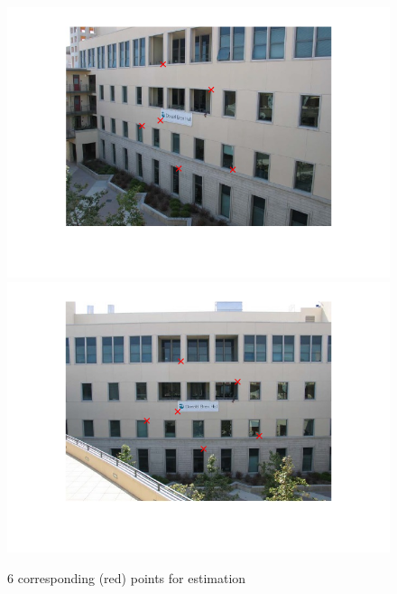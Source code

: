 \documentclass{article}
\theoremstyle{plain} \newtheorem{prop}{Proposition}
\begin{document}
\begin{figure}
	\centering
	\includegraphics[scale=0.5]{Left_marked.png}
	\includegraphics[scale=0.5]{Right_marked.png}
	\caption{6 corresponding (red) points for estimation}
	\label{fig-6}
\end{figure}
\end{document}
